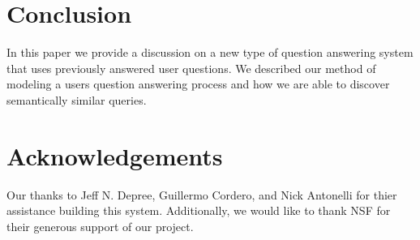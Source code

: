 
\section{Conclusion}

In this paper we provide a discussion on a new type of question
answering system that uses previously answered user questions.  We
described our method of modeling a users question answering process
and how we are able to discover semantically similar queries.


\section{Acknowledgements}
Our thanks to Jeff N. Depree, Guillermo Cordero, and Nick Antonelli for thier assistance building this system. Additionally, we would like to thank NSF for their generous support of our project.
